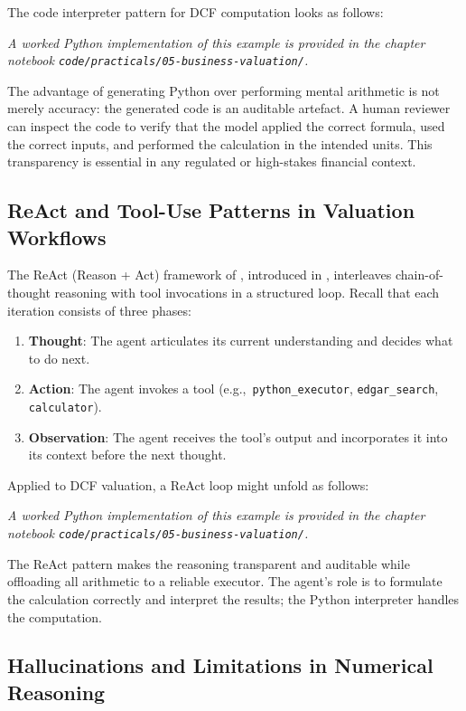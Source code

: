 \begin{deepdive}
The code interpreter pattern for DCF computation looks as follows:

\textit{A worked Python implementation of this example is provided in the chapter notebook \texttt{code/practicals/05-business-valuation/}.}

The advantage of generating Python over performing mental arithmetic is not merely
accuracy: the generated code is an auditable artefact. A human reviewer can inspect
the code to verify that the model applied the correct formula, used the correct
inputs, and performed the calculation in the intended units. This transparency is
essential in any regulated or high-stakes financial context.

\subsection{ReAct and Tool-Use Patterns in Valuation Workflows}
\label{subsec:bv-tools-react}

The ReAct (Reason + Act) framework of \citet{yao2022react}, introduced in
, interleaves chain-of-thought reasoning with tool invocations in a
structured loop. Recall that each iteration consists of three phases:

\begin{enumerate}
  \item \textbf{Thought}: The agent articulates its current understanding and decides
        what to do next.
  \item \textbf{Action}: The agent invokes a tool (e.g.,\ \texttt{python\_executor},
        \texttt{edgar\_search}, \texttt{calculator}).
  \item \textbf{Observation}: The agent receives the tool's output and incorporates it
        into its context before the next thought.
\end{enumerate}

Applied to DCF valuation, a ReAct loop might unfold as follows:

\textit{A worked Python implementation of this example is provided in the chapter notebook \texttt{code/practicals/05-business-valuation/}.}

The ReAct pattern makes the reasoning transparent and auditable while offloading all
arithmetic to a reliable executor. The agent's role is to formulate the calculation
correctly and interpret the results; the Python interpreter handles the computation.

\subsection{Hallucinations and Limitations in Numerical Reasoning}
\label{subsec:bv-tools-hallucinations}


\end{deepdive}
